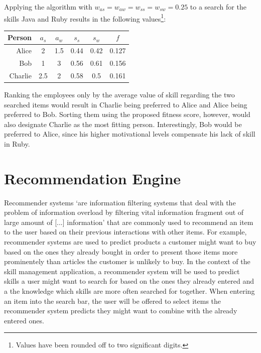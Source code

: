 Applying the algorithm with $w_{as} = w_{aw} = w_{ss} = w_{sw} = 0.25$ to a search for the skills Java and Ruby results in the following values\footnote{Values have been rounded off to two significant digits.}:


\begin{center}
\begin{tabular}{r|ccccc}
  Person  & $a_s$ & $a_w$ & $s_s$ & $s_w$ & $f$\\
  \hline
  Alice   & 2   & 1.5 & 0.44 & 0.42 & 0.127\\
  Bob     & 1   & 3   & 0.56 & 0.61 & 0.156\\
  Charlie & 2.5 & 2   & 0.58 & 0.5  & 0.161\\
\end{tabular}
\end{center}

Ranking the employees only by the average value of skill regarding the two searched items would result in Charlie being preferred to Alice and Alice being preferred to Bob. Sorting them using the proposed fitness score, however, would also designate Charlie as the most fitting person. Interestingly, Bob would be preferred to Alice, since his higher motivational levels compensate his lack of skill in Ruby.

\section{Recommendation Engine}
Recommender systems `are information filtering systems that deal with the problem of information overload by filtering vital information fragment out of large amount of [...] information' \cite{Isinkaye2015261} that are commonly used to recommend an item to the user based on their previous interactions with other items. For example, recommender systems are used to predict products a customer might want to buy based on the ones they already bought in order to present those items
more prominentely than articles the customer is unlikely to buy. In the context of the skill management application, a recommender system will be used to predict skills a user might want to search for based on the ones they already entered and a the knowledge which skills are more often searched for together.
When entering an item into the search bar, the user will be offered to select items the recommender system predicts they might want to combine with the already entered ones.

